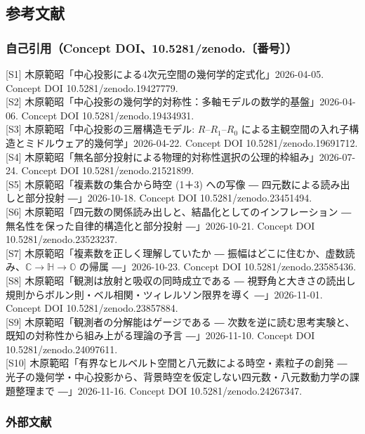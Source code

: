 \documentclass[
  a4paper,
]{ltjsarticle}
\begin{document}
\subsection{参考文献}\label{ux53c2ux8003ux6587ux732e}

\subsubsection{自己引用（Concept
DOI、10.5281/zenodo.〔番号〕）}\label{ux81eaux5df1ux5f15ux7528concept-doi10.5281zenodo.ux756aux53f7}

{[}S1{]} 木原範昭「中心投影による4次元空間の幾何学的定式化」2026-04-05.
Concept DOI 10.5281/zenodo.19427779.\\
{[}S2{]}
木原範昭「中心投影の幾何学的対称性：多軸モデルの数学的基盤」2026-04-06.
Concept DOI 10.5281/zenodo.19434931.\\
{[}S3{]} 木原範昭「中心投影の三層構造モデル: \(R\)--\(R_1\)--\(R_0\)
による主観空間の入れ子構造とミドルウェア的幾何学」2026-04-22. Concept
DOI 10.5281/zenodo.19691712.\\
{[}S4{]}
木原範昭「無名部分投射による物理的対称性選択の公理的枠組み」2026-07-24.
Concept DOI 10.5281/zenodo.21521899.\\
{[}S5{]} 木原範昭「複素数の集合から時空 (1＋3) への写像 ―
四元数による読み出しと部分投射 ―」2026-10-18. Concept DOI
10.5281/zenodo.23451494.\\
{[}S6{]}
木原範昭「四元数の関係読み出しと、結晶化としてのインフレーション ―
無名性を保った自律的構造化と部分投射 ―」2026-10-21. Concept DOI
10.5281/zenodo.23523237.\\
{[}S7{]} 木原範昭「複素数を正しく理解していたか ―
振幅はどこに住むか、虚数読み、\(\mathbb{C} \to \mathbb{H} \to \mathbb{O}\)
の帰属 ―」2026-10-23. Concept DOI 10.5281/zenodo.23585436.\\
{[}S8{]} 木原範昭「観測は放射と吸収の同時成立である ―
視野角と大きさの読出し規則からボルン則・ベル相関・ツィレルソン限界を導く
―」2026-11-01. Concept DOI 10.5281/zenodo.23857884.\\
{[}S9{]} 木原範昭「観測者の分解能はゲージである ―
次数を逆に読む思考実験と、既知の対称性から組み上がる理論の予言
―」2026-11-10. Concept DOI 10.5281/zenodo.24097611.\\
{[}S10{]} 木原範昭「有界なヒルベルト空間と八元数による時空・素粒子の創発
―
光子の幾何学・中心投影から、背景時空を仮定しない四元数・八元数動力学の課題整理まで
―」2026-11-16. Concept DOI 10.5281/zenodo.24267347.

\subsubsection{外部文献}\label{ux5916ux90e8ux6587ux732e}
\end{document}
